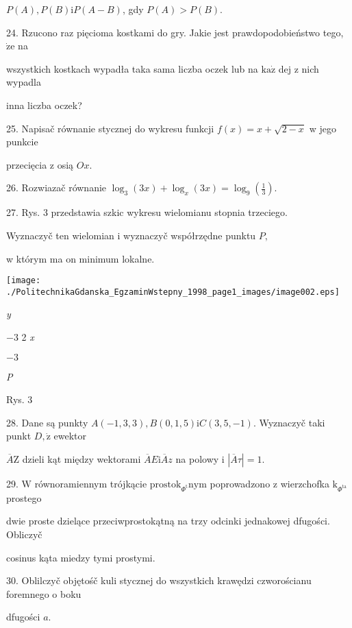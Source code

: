 \documentclass[a4paper,12pt]{article}
\begin{document}
$P(A), P(B)\mathrm{i}P(A-B)$, gdy $P(A)>P(B).$

24. Rzucono raz pięcioma kostkami do gry. Jakie jest prawdopodobieństwo tego, $\dot{\mathrm{z}}\mathrm{e}$ na

wszystkich kostkach wypadła taka sama liczba oczek lub na $\mathrm{k}\mathrm{a}\dot{\mathrm{z}}$ dej z nich wypadla

inna liczba oczek?

25. Napisač równanie stycznej do wykresu funkcji $f(x) = x+\sqrt{2-x}$ w jego punkcie

przecięcia z osią $Ox.$

26. Rozwiazač równanie $\displaystyle \log_{3}(3x)+\log_{x}(3x)=\log_{9}(\frac{1}{3}).$

27. Rys. 3 przedstawia szkic wykresu wielomianu stopnia trzeciego.

Wyznaczyč ten wielomian i wyznaczyč współrzędne punktu $P,$

w którym ma on minimum lokalne.
\begin{center}
\texttt{[image: ./PolitechnikaGdanska\_EgzaminWstepny\_1998\_page1\_images/image002.eps]}
\end{center}
{\it y}

$-3$ 2  {\it x}

$-3$

{\it P}

Rys. 3

28. Dane są punkty $A(-1,3,3), B(0,1,5)\mathrm{i}C(3,5,-1)$. Wyznaczyč taki punkt $D, \dot{\mathrm{z}}$ ewektor

$\overline{A}\mathrm{Z}$ dzieli kąt między wektorami $\overline{A}E\mathrm{i}\overline{A}z$ na polowy i $|\overline{A}\tau|=1.$

29. $\mathrm{W}$ równoramiennym trójkącie $\mathrm{p}\mathrm{r}\mathrm{o}\mathrm{s}\mathrm{t}\mathrm{o}\mathrm{k}_{\Phi^{\mathrm{t}}}\mathrm{n}\mathrm{y}\mathrm{m}$ poprowadzono z wierzchofka $\mathrm{k}_{\Phi^{\mathrm{t}\mathrm{a}}}$ prostego

dwie proste dzielące przeciwprostokątną na trzy odcinki jednakowej dfugości. Obliczyč

cosinus kąta miedzy tymi prostymi.

30. Oblilczyč objętośč kuli stycznej do wszystkich krawędzi czworościanu foremnego o boku

dfugości $a.$
\end{document}
